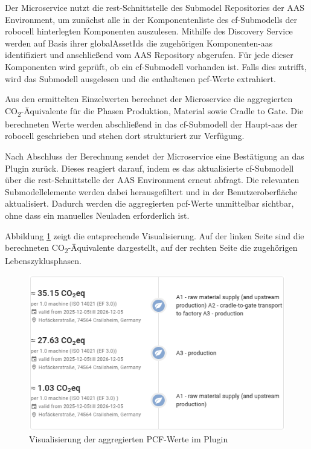 Der Microservice nutzt die \acs{rest}-Schnittstelle des Submodel Repositories der AAS Environment, um zunächst alle in der Komponentenliste des \acs{cf}-Submodells der robocell hinterlegten Komponenten auszulesen. 
Mithilfe des Discovery Service werden auf Basis ihrer globalAssetIds die zugehörigen Komponenten-\acs{aas} identifiziert und anschließend vom AAS Repository abgerufen.
Für jede dieser Komponenten wird geprüft, ob ein \acs{cf}-Submodell vorhanden ist. 
Falls dies zutrifft, wird das Submodell ausgelesen und die enthaltenen \acs{pcf}-Werte extrahiert.

Aus den ermittelten Einzelwerten berechnet der Microservice die aggregierten CO\textsubscript{2}-Äquivalente für die Phasen Produktion, Material sowie Cradle to Gate. 
Die berechneten Werte werden abschließend in das \acs{cf}-Submodell der Haupt-\acs{aas} der robocell geschrieben und stehen dort strukturiert zur Verfügung.

Nach Abschluss der Berechnung sendet der Microservice eine Bestätigung an das Plugin zurück. 
Dieses reagiert darauf, indem es das aktualisierte \acs{cf}-Submodell über die \acs{rest}-Schnittstelle der AAS Environment erneut abfragt. 
Die relevanten Submodellelemente werden dabei herausgefiltert und in der Benutzeroberfläche aktualisiert. 
Dadurch werden die aggregierten \acs{pcf}-Werte unmittelbar sichtbar, ohne dass ein manuelles Neuladen erforderlich ist.

Abbildung \ref{fig:PluginAggregation} zeigt die entsprechende Visualisierung. 
Auf der linken Seite sind die berechneten CO\textsubscript{2}-Äquivalente dargestellt, auf der rechten Seite die zugehörigen Lebenszyklusphasen.

\begin{figure}[htbp]
    \centering
        \includegraphics{Bilder/Ergebnisse/DPP/PluginAggregation.png}
    \caption{Visualisierung der aggregierten PCF-Werte im Plugin}
    \label{fig:PluginAggregation}
\end{figure}

